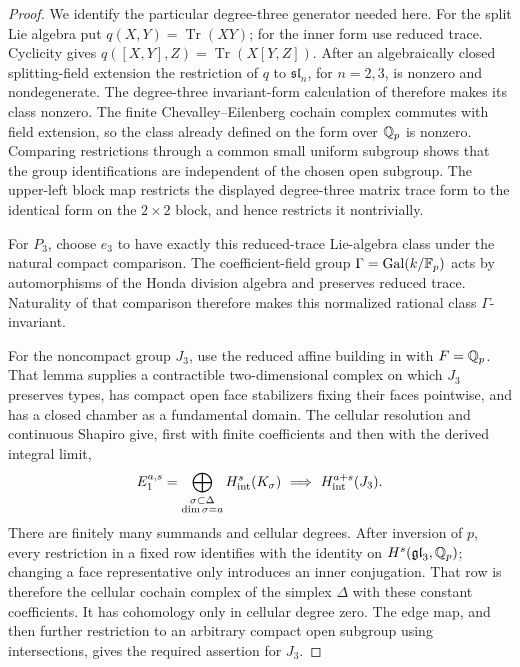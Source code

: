 \begin{proof}
We identify the particular degree-three generator needed here.
For the split Lie algebra put $q(X,Y)=\operatorname{Tr}(XY)$;
for the inner form use reduced trace.  Cyclicity gives
$q([X,Y],Z)=\operatorname{Tr}(X[Y,Z])$.  After an algebraically
closed splitting-field extension the restriction of $q$ to
$\mathfrak{sl}_n$, for $n=2,3$, is nonzero and nondegenerate.
The degree-three invariant-form calculation of
\cite[Section~11, Theorems~11.1--11.2]{Koszul1950}
therefore makes its class nonzero.  The finite Chevalley--Eilenberg
cochain complex commutes with field extension, so the class already
defined on the form over $\mathbb Q_p$ is nonzero.  Comparing restrictions through a
common small uniform subgroup shows that the group identifications
are independent of the chosen open subgroup.  The upper-left block
map restricts the displayed degree-three matrix trace form to the
identical form on the $2\times2$ block, and hence restricts it
nontrivially.

For $P_3$, choose $e_3$ to have exactly this reduced-trace Lie-algebra
class under the natural compact comparison.  The coefficient-field
group $\Gamma=\operatorname{Gal}(k/\mathbb F_p)$ acts by automorphisms of the Honda division
algebra and preserves reduced trace.  Naturality of that comparison
therefore makes this normalized rational class $\Gamma$-invariant.

For the noncompact group $J_3$, use the reduced affine building in
 with $F=\mathbb Q_p$.  That lemma supplies
a contractible two-dimensional complex on which $J_3$ preserves types,
has compact open face stabilizers fixing their faces pointwise, and has
a closed chamber as a fundamental domain.  The cellular resolution and continuous
Shapiro give, first with finite coefficients and then with the
derived integral limit,
\[
 E_1^{a,s}=\bigoplus_{\substack{\sigma\subset\Delta\cr
                         \dim\sigma=a}}
 H^s_{\mathrm{int}}(K_\sigma)
       \ \Longrightarrow\ H^{a+s}_{\mathrm{int}}(J_3).
\]
There are finitely many summands and cellular degrees.  After
inversion of $p$, every restriction in a fixed row identifies with
the identity on $H^s(\mathfrak{gl}_3,\mathbb Q_p)$; changing a face
representative only introduces an inner conjugation.  That row
is therefore the cellular cochain complex of the simplex $\Delta$
with these constant coefficients.  It has cohomology only in
cellular degree zero.  The edge map, and then further restriction
to an arbitrary compact open subgroup using intersections, gives
the required assertion for $J_3$.


\end{proof}
